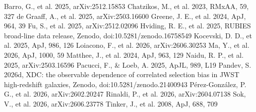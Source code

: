 \documentclass[twocolumn]{aastex631}
\begin{document}
\begin{thebibliography}{}
 Barro, G., et al. 2025,
arXiv:2512.15853
 Chatzikos, M., et al.
2023, RMxAA, 59, 327
 de Graaff, A., et al.
2025, arXiv:2503.16600
 Greene, J. E., et al. 2024,
ApJ, 964, 39
 Fu, S., et al. 2025, arXiv:2512.02096
 Hviding, R. E., et al. 2025,
RUBIES broad-line data release, Zenodo, doi:10.5281/zenodo.16758549
 Kocevski, D. D., et al.
2025, ApJ, 986, 126
 Loiacono, F., et al. 2026,
arXiv:2606.30253
 Ma, Y., et al. 2026, ApJ, 1000, 59
 Matthee, J., et al. 2024,
ApJ, 963, 129
 Naidu, R. P., et al. 2025,
arXiv:2503.16596
 Pacucci, F., \& Loeb,
A. 2025, ApJL, 989, L19
 Pandev, S. 2026d, XDC: the
observable dependence of correlated selection bias in JWST
high-redshift galaxies, Zenodo, doi:10.5281/zenodo.21400943
P\'erez-Gonz\'alez, P. G., et al. 2026, arXiv:2602.20247
 Rinaldi, P., et al. 2026,
arXiv:2604.07138
 Sok, V., et al. 2026, arXiv:2606.23778
 Tinker, J., et al. 2008, ApJ,
688, 709
\end{thebibliography}
\end{document}

